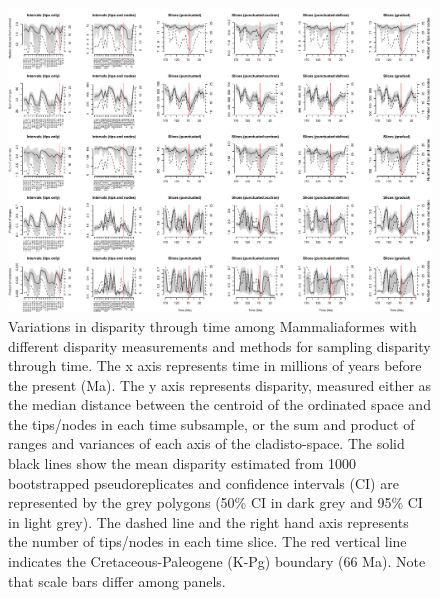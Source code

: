 \begin{landscape}
\begin{figure}[!htbp]
\centering
    \includegraphics[width=\textwidth,height=\textheight,keepaspectratio]{Supplementaries/Figures/STD/Mammaliaformes_all_methods.pdf}
\caption[Comparison of all the disparity metrics and all the time sampling methods for Mammaliaformes]{Variations in disparity through time among Mammaliaformes with different disparity measurements and methods for sampling disparity through time. The x axis represents time in millions of years before the present (Ma). The y axis represents disparity, measured either as the median distance between the centroid of the ordinated space and the tips/nodes in each time subsample, or the sum and product of ranges and variances of each axis of the cladisto-space. The solid black lines show the mean disparity estimated from 1000 bootstrapped pseudoreplicates and confidence intervals (CI) are represented by the grey polygons (50\% CI in dark grey and 95\% CI in light grey). The dashed line and the right hand axis represents the number of tips/nodes in each time slice. The red vertical line indicates the Cretaceous-Paleogene (K-Pg) boundary (66 Ma). Note that scale bars differ among panels.}
\label{Supp_disparity_all_Mammaliaformes}
\end{figure}
\end{landscape}

